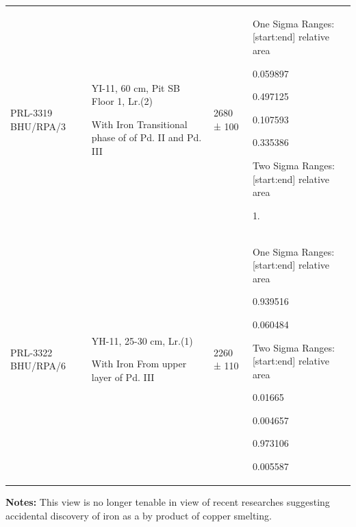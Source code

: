 {{{\begin{longtable}{|p{1.3cm}|p{1.6cm}|p{1.6cm}|p{4.4cm}|}
PRL-3319 BHU/RPA/3  & YI-11, 60 cm,  Pit SB Floor 1, Lr.(2) \par With Iron Transitional phase of of Pd. II and Pd. III & 2680 ± 100  & One Sigma Ranges: [start:end] relative area \par  [cal BC 894: cal BC 873] 0.059897\par  [cal BC 849: cal BC 734] 0.497125\par  [cal BC 690: cal BC 662] 0.107593 \par  [cal BC 649: cal BC 546] 0.335386\par Two Sigma Ranges: [start:end] relative area\par  [cal BC 926: cal BC 413] 1.\\
PRL-3322  BHU/RPA/6 & YH-11, 25-30 cm, Lr.(1)\par With Iron From upper layer of Pd. III & 2260 ± 110 & One Sigma Ranges: [start:end] relative area \par [cal BC 387: cal BC 159] 0.939516 \par [cal BC 134: cal BC 116] 0.060484 \par Two Sigma Ranges: [start:end] relative area \par [cal BC 507: cal BC 459] 0.01665 \par [cal BC 453: cal BC 439] 0.004657 \par [cal BC 419: cal AD 31] 0.973106 \par [cal AD 37: cal AD 52] 0.005587
\end{longtable}
\textbf{Notes:} This view is no longer tenable in view of recent researches suggesting accidental discovery of iron as a by product of copper smelting.
}}}


\label{endchapter3}
